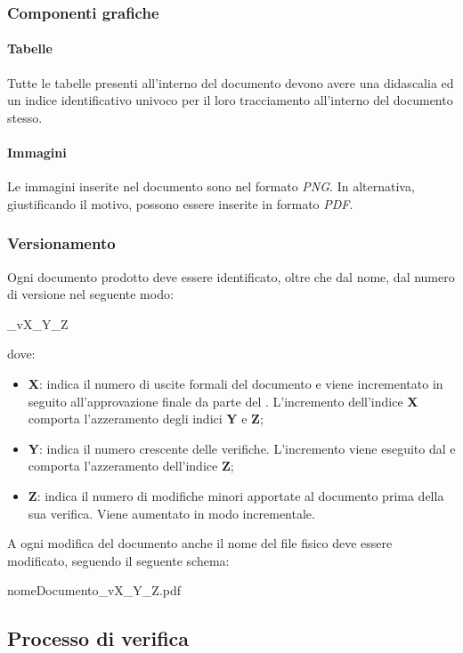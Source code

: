 \subsubsection{Componenti grafiche}
\paragraph{Tabelle}
Tutte le tabelle presenti all'interno del documento devono avere una didascalia 
ed un indice identificativo univoco per il loro tracciamento all'interno del 
documento stesso.
\paragraph{Immagini}
Le immagini inserite nel documento sono nel formato \textit{PNG}. In alternativa, 
giustificando il motivo, possono essere inserite in formato \textit{PDF}.
\subsubsection{Versionamento}
Ogni documento prodotto deve essere identificato, oltre che dal nome, dal numero 
di versione nel seguente modo:
\begin{center}
  \_vX\_Y\_Z
\end{center}
dove:

\begin{itemize}
  \item \textbf{X}: indica il numero di uscite formali del documento e viene 
  incrementato in seguito all'approvazione finale da parte del \textit{\RdP}. 
  L'incremento dell'indice \textbf{X} comporta l'azzeramento degli indici 
  \textbf{Y} e \textbf{Z};
  \item \textbf{Y}: indica il numero crescente delle verifiche. L'incremento viene 	eseguito dal \textit{\Ver} e comporta l'azzeramento dell'indice \textbf{Z};
  \item \textbf{Z}: indica il numero di modifiche minori apportate al documento 
  prima della sua verifica. Viene aumentato in modo incrementale. 
  \end{itemize}
A ogni modifica del documento anche il nome del file fisico deve essere 
modificato, seguendo il seguente schema:
\begin{center}
  nomeDocumento\_vX\_Y\_Z.pdf
\end{center}

\subsection{Processo di verifica}
